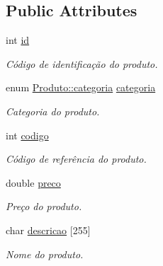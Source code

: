 \subsection*{Public Attributes}
\begin{DoxyCompactItemize}
\item 
\mbox{\label{structProduto_a4e1f150fa0cc84776ba28939fb547bf1}} 
int \hyperlink{structProduto_a4e1f150fa0cc84776ba28939fb547bf1}{id}
\begin{DoxyCompactList}\small\item\em Código de identificação do produto. \end{DoxyCompactList}\item 
\mbox{\label{structProduto_ac4e911b4f0d1fa0b55809f1027edc503}} 
enum \hyperlink{structProduto_a790d0998d9d717ef53640efea920b427}{Produto\+::categoria} \hyperlink{structProduto_ac4e911b4f0d1fa0b55809f1027edc503}{categoria}
\begin{DoxyCompactList}\small\item\em Categoria do produto. \end{DoxyCompactList}\item 
\mbox{\label{structProduto_a46ef2f0c721c04a662674f3ef47208c1}} 
int \hyperlink{structProduto_a46ef2f0c721c04a662674f3ef47208c1}{codigo}
\begin{DoxyCompactList}\small\item\em Código de referência do produto. \end{DoxyCompactList}\item 
\mbox{\label{structProduto_a2ad13f91582fd70e878fc449c7b77171}} 
double \hyperlink{structProduto_a2ad13f91582fd70e878fc449c7b77171}{preco}
\begin{DoxyCompactList}\small\item\em Preço do produto. \end{DoxyCompactList}\item 
\mbox{\label{structProduto_aef9b8df5eb9539ae496bec1401489800}} 
char \hyperlink{structProduto_aef9b8df5eb9539ae496bec1401489800}{descricao} \mbox{[}255\mbox{]}
\begin{DoxyCompactList}\small\item\em Nome do produto. \end{DoxyCompactList}\item 

\end{DoxyCompactItemize}
